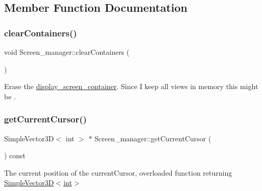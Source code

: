 \subsection{Member Function Documentation}
\mbox{\label{classScreen__manager_a5896c354d45b0b4142a76b26f7081787}} 
\subsubsection{\texorpdfstring{clear\+Containers()}{clearContainers()}}
{\footnotesize\ttfamily void Screen\+\_\+manager\+::clear\+Containers (\begin{DoxyParamCaption}{ }\end{DoxyParamCaption})\hspace{0.3cm}{\ttfamily [protected]}}

Erase the \mbox{\hyperlink{classdisplay__screen__container}{display\+\_\+screen\+\_\+container}}. Since I keep all views in memory this might be . \mbox{\label{classScreen__manager_a86a2c051954195c03f8718f4e371c221}} 
\subsubsection{\texorpdfstring{get\+Current\+Cursor()}{getCurrentCursor()}\hspace{0.1cm}{\footnotesize\ttfamily [1/2]}}
{\footnotesize\ttfamily Simple\+Vector3D$<$ int $>$ $\ast$ Screen\+\_\+manager\+::get\+Current\+Cursor (\begin{DoxyParamCaption}{ }\end{DoxyParamCaption}) const\hspace{0.3cm}{\ttfamily [inline]}}

The current position of the current\+Cursor, overloaded function returning \mbox{\hyperlink{classViewer_1_1SimpleVector3D}{Simple\+Vector3\+D$<$int$>$}} \mbox{\label{classScreen__manager_a9cb3da1f84299ee2c32e4032e7e19ed1}} 
